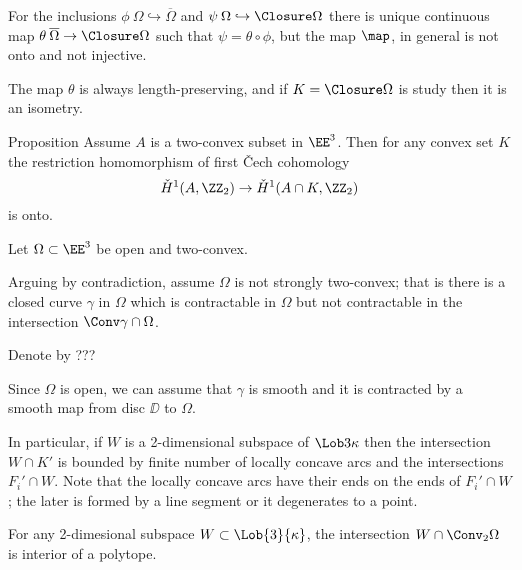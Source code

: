 For the inclusions $\phi\:\Omega\hookrightarrow\overline\Omega$ and $\psi\:\Omega\hookrightarrow\Closure\Omega$ there is unique continuous map 
$\theta\:\overline\Omega\to\Closure\Omega$ such that $\psi=\theta\circ\phi$,
but the map $\map$, in general is not onto and not injective.

The map $\theta$ is always length-preserving, and if $K=\Closure\Omega$ is study then it is an isometry.

















\begin{thm}{Proposition}\label{prop:stong-two-convex}
Assume $A$ is a  two-convex subset in $\EE^3$.
Then for any convex set $K$ the restriction homomorphism of first \v{C}ech cohomology
\[\check{H}^1(A,\ZZ_2)\to \check{H}^1(A\cap K,\ZZ_2)\]
is onto.
\end{thm}

Let $\Omega\subset \EE^3$ be open and two-convex.

Arguing by contradiction, assume $\Omega$ is not strongly two-convex;
that is there is a closed curve $\gamma$
in $\Omega$ 
which is contractable in $\Omega$ but not contractable in the intersection $\Conv\gamma\cap \Omega$.

Denote by ???

Since $\Omega$ is open, 
we can assume that $\gamma$ is smooth
and it is contracted by a smooth map from disc $\DD$ to $\Omega$.

 
\qeds













In particular, if $W$ is a 2-dimensional subspace of $\Lob3\kappa$ 
then the intersection $W\cap K'$ is bounded 
by finite number of locally concave arcs and the  intersections $F_i'\cap W$.
Note that the locally concave arcs have their ends on the ends of $F_i'\cap W$;
the later is formed by a line segment or it degenerates to a point.

\begin{clm}{}\label{clm:intersection-is-polytope}
For any 2-dimesional subspace $W\subset\Lob{3}{\kappa}$,
the intersection $W\cap \Conv_2 \Omega$ is interior of a polytope.
\end{clm}

